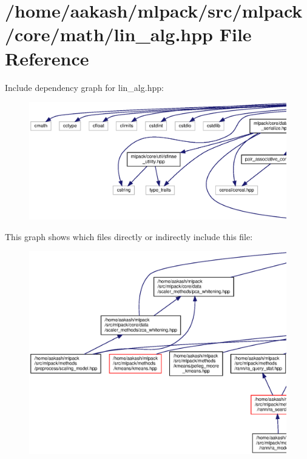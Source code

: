 \section{/home/aakash/mlpack/src/mlpack/core/math/lin\+\_\+alg.hpp File Reference}
\label{lin__alg_8hpp}
Include dependency graph for lin\+\_\+alg.\+hpp\+:
\nopagebreak
\begin{figure}[H]
\begin{center}
\leavevmode
\includegraphics[width=350pt]{lin__alg_8hpp__incl}
\end{center}
\end{figure}
This graph shows which files directly or indirectly include this file\+:
\nopagebreak
\begin{figure}[H]
\begin{center}
\leavevmode
\includegraphics[width=350pt]{lin__alg_8hpp__dep__incl}
\end{center}
\end{figure}

